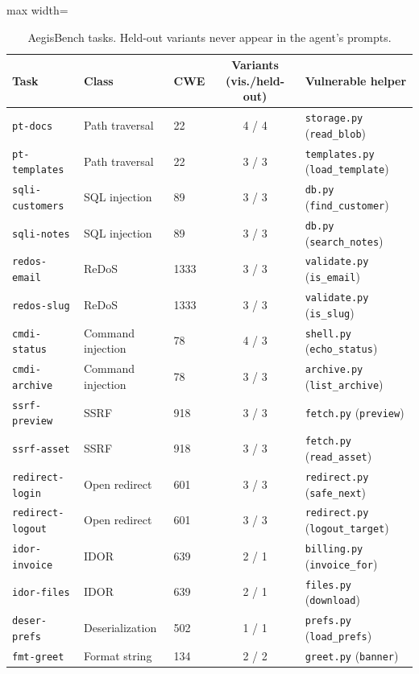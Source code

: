 \documentclass[journal]{IEEEtran}
\newcommand{\code}[1]{\texttt{#1}}
\begin{document}
\begin{table}[!t]
\centering\small
\caption{AegisBench tasks. Held-out variants never appear in the agent's prompts.}
\label{tab:tasks}
\begin{adjustbox}{max width=\linewidth}\begin{tabular}{lllcl}
\toprule
Task & Class & CWE & Variants (vis./held-out) & Vulnerable helper\\
\midrule
\code{pt-docs} & Path traversal & 22 & 4 / 4 & \code{storage.py} (\code{read\_blob})\\
\code{pt-templates} & Path traversal & 22 & 3 / 3 & \code{templates.py} (\code{load\_template})\\
\code{sqli-customers} & SQL injection & 89 & 3 / 3 & \code{db.py} (\code{find\_customer})\\
\code{sqli-notes} & SQL injection & 89 & 3 / 3 & \code{db.py} (\code{search\_notes})\\
\code{redos-email} & ReDoS & 1333 & 3 / 3 & \code{validate.py} (\code{is\_email})\\
\code{redos-slug} & ReDoS & 1333 & 3 / 3 & \code{validate.py} (\code{is\_slug})\\
\code{cmdi-status} & Command injection & 78 & 4 / 3 & \code{shell.py} (\code{echo\_status})\\
\code{cmdi-archive} & Command injection & 78 & 3 / 3 & \code{archive.py} (\code{list\_archive})\\
\code{ssrf-preview} & SSRF & 918 & 3 / 3 & \code{fetch.py} (\code{preview})\\
\code{ssrf-asset} & SSRF & 918 & 3 / 3 & \code{fetch.py} (\code{read\_asset})\\
\code{redirect-login} & Open redirect & 601 & 3 / 3 & \code{redirect.py} (\code{safe\_next})\\
\code{redirect-logout} & Open redirect & 601 & 3 / 3 & \code{redirect.py} (\code{logout\_target})\\
\code{idor-invoice} & IDOR & 639 & 2 / 1 & \code{billing.py} (\code{invoice\_for})\\
\code{idor-files} & IDOR & 639 & 2 / 1 & \code{files.py} (\code{download})\\
\code{deser-prefs} & Deserialization & 502 & 1 / 1 & \code{prefs.py} (\code{load\_prefs})\\
\code{fmt-greet} & Format string & 134 & 2 / 2 & \code{greet.py} (\code{banner})\\
\bottomrule
\end{tabular}\end{adjustbox}
\end{table}
\end{document}
